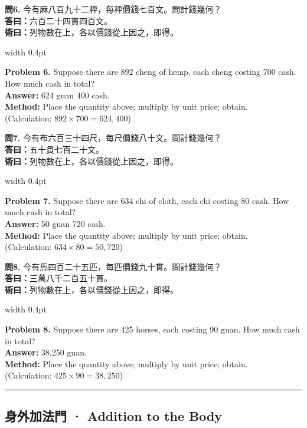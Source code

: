 \documentclass[10pt,a4paper]{article}
\newcommand{\longline}{\noindent\rule{\textwidth}{0.3pt}}
\newlength{\cnwidth}
\newlength{\enwidth}
\newcommand{\bilingual}[2]{%
  \noindent%
  \begin{minipage}[t]{\cnwidth}%
    #1%
  \end{minipage}%
  \hfill\vrule width 0.4pt\hfill%
  \begin{minipage}[t]{\enwidth}%
    #2%
  \end{minipage}%
  \par\smallskip%
}
\newcommand{\bilingualsubsection}[2]{%
  \subsection*{#1 · #2}
}
\begin{document}
\bilingual{%
  \textbf{問6.}
  今有麻八百九十二秤，每秤價錢七百文。問計錢幾何？\\
  \textbf{答曰：}六百二十四貫四百文。\\
  \textbf{術曰：}列物數在上，各以價錢從上因之，即得。
}{%
  \textbf{Problem 6.}
  Suppose there are 892 cheng of hemp, each cheng costing 700 cash.
  How much cash in total?\\
  \textbf{Answer:} 624 guan 400 cash.\\
  \textbf{Method:} Place the quantity above; multiply by unit price; obtain.\\
  (Calculation: $892 \times 700 = 624{,}400$)
}

\bilingual{%
  \textbf{問7.}
  今有布六百三十四尺，每尺價錢八十文。問計錢幾何？\\
  \textbf{答曰：}五十貫七百二十文。\\
  \textbf{術曰：}列物數在上，各以價錢從上因之，即得。
}{%
  \textbf{Problem 7.}
  Suppose there are 634 chi of cloth, each chi costing 80 cash.
  How much cash in total?\\
  \textbf{Answer:} 50 guan 720 cash.\\
  \textbf{Method:} Place the quantity above; multiply by unit price; obtain.\\
  (Calculation: $634 \times 80 = 50{,}720$)
}

\bilingual{%
  \textbf{問8.}
  今有馬四百二十五匹，每匹價錢九十貫。問計錢幾何？\\
  \textbf{答曰：}三萬八千二百五十貫。\\
  \textbf{術曰：}列物數在上，各以價錢從上因之，即得。
}{%
  \textbf{Problem 8.}
  Suppose there are 425 horses, each costing 90 guan.
  How much cash in total?\\
  \textbf{Answer:} 38,250 guan.\\
  \textbf{Method:} Place the quantity above; multiply by unit price; obtain.\\
  (Calculation: $425 \times 90 = 38{,}250$)
}

\longline

\bilingualsubsection{身外加法門}{Addition to the Body}
\label{sec:shenwaijia}
\end{document}
